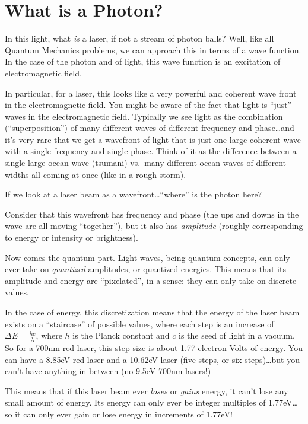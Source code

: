 \documentclass[]{article}
\begin{document}
\section{What is a Photon?}\label{what-is-a-photon}

In this light, what \emph{is} a laser, if not a stream of photon balls? Well,
like all Quantum Mechanics problems, we can approach this in terms of a wave
function. In the case of the photon and of light, this wave function is an
excitation of electromagnetic field.

In particular, for a laser, this looks like a very powerful and coherent wave
front in the electromagnetic field. You might be aware of the fact that light is
``just'' waves in the electromagnetic field. Typically we see light as the
combination (``superposition'') of many different waves of different frequency
and phase\ldots and it's very rare that we get a wavefront of light that is just
one large coherent wave with a single frequency and single phase. Think of it as
the difference between a single large ocean wave (tsumani) vs.~many different
ocean waves of different widths all coming at once (like in a rough storm).

If we look at a laser beam as a wavefront\ldots{}``where'' is the photon here?

Consider that this wavefront has frequency and phase (the ups and downs in the
wave are all moving ``together''), but it also has \emph{amplitude} (roughly
corresponding to energy or intensity or brightness).

Now comes the quantum part. Light waves, being quantum concepts, can only ever
take on \emph{quantized} amplitudes, or quantized energies. This means that its
amplitude and energy are ``pixelated'', in a sense: they can only take on
discrete values.

In the case of energy, this discretization means that the energy of the laser
beam exists on a ``staircase'' of possible values, where each step is an
increase of \(\Delta E = \frac{h c}{\lambda}\), where \(h\) is the Planck
constant and \(c\) is the seed of light in a vacuum. So for a 700nm red laser,
this step size is about 1.77 electron-Volts of energy. You can have a 8.85eV red
laser and a 10.62eV laser (five steps, or six steps)\ldots but you can't have
anything in-between (no 9.5eV 700nm lasers!)

This means that if this laser beam ever \emph{loses} or \emph{gains} energy, it
can't lose any small amount of energy. Its energy can only ever be integer
multiples of 1.77eV\ldots so it can only ever gain or lose energy in increments
of 1.77eV!
\end{document}

